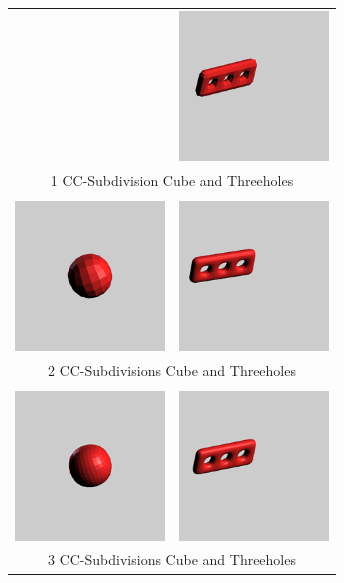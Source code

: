 \documentclass[12pt,a4paper]{scrartcl}
\begin{document}
\begin{longtable}{cc}
		& \includegraphics[width=150px, height=150px]{Images/threeholes-1sd.png}  \\
		\multicolumn{2}{c}{1 CC-Subdivision Cube and Threeholes} \\
		&\\
		\includegraphics[width=150px, height=150px]{Images/cube-2sd.png} 
		& \includegraphics[width=150px, height=150px]{Images/threeholes-2sd.png}  \\
		\multicolumn{2}{c}{2 CC-Subdivisions Cube and Threeholes} \\
		&\\
		\includegraphics[width=150px, height=150px]{Images/cube-3sd.png} 
		& \includegraphics[width=150px, height=150px]{Images/threeholes-3sd.png}  \\
		\multicolumn{2}{c}{3 CC-Subdivisions Cube and Threeholes} \\
	\end{longtable}
\end{document}
